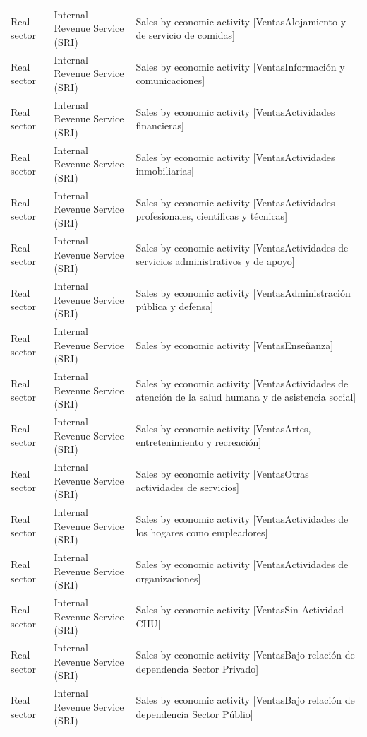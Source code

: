 \documentclass[10pt,a4paper]{article}
\begin{document}
\begin{longtable}{@{}>{\raggedright\arraybackslash}p{3.5cm}>{\raggedright\arraybackslash}p{5.6cm}>{\raggedright\arraybackslash}p{\dimexpr\textwidth-9.1cm-4\tabcolsep\relax}@{}}
Real sector & Internal Revenue Service (SRI) & Sales by economic activity [VentasAlojamiento y de servicio de comidas]\\
Real sector & Internal Revenue Service (SRI) & Sales by economic activity [VentasInformaci\'{o}n y comunicaciones]\\
Real sector & Internal Revenue Service (SRI) & Sales by economic activity [VentasActividades financieras]\\
Real sector & Internal Revenue Service (SRI) & Sales by economic activity [VentasActividades inmobiliarias]\\
Real sector & Internal Revenue Service (SRI) & Sales by economic activity [VentasActividades profesionales, cient\'{i}ficas y t\'{e}cnicas]\\
Real sector & Internal Revenue Service (SRI) & Sales by economic activity [VentasActividades de servicios administrativos y de apoyo]\\
Real sector & Internal Revenue Service (SRI) & Sales by economic activity [VentasAdministraci\'{o}n p\'{u}blica y defensa]\\
Real sector & Internal Revenue Service (SRI) & Sales by economic activity [VentasEnse\~{n}anza]\\
Real sector & Internal Revenue Service (SRI) & Sales by economic activity [VentasActividades de atenci\'{o}n de la salud humana y de asistencia social]\\
Real sector & Internal Revenue Service (SRI) & Sales by economic activity [VentasArtes, entretenimiento y recreaci\'{o}n]\\
Real sector & Internal Revenue Service (SRI) & Sales by economic activity [VentasOtras actividades de servicios]\\
Real sector & Internal Revenue Service (SRI) & Sales by economic activity [VentasActividades de los hogares como empleadores]\\
Real sector & Internal Revenue Service (SRI) & Sales by economic activity [VentasActividades de organizaciones]\\
Real sector & Internal Revenue Service (SRI) & Sales by economic activity [VentasSin Actividad CIIU]\\
Real sector & Internal Revenue Service (SRI) & Sales by economic activity [VentasBajo relaci\'{o}n de dependencia Sector Privado]\\
Real sector & Internal Revenue Service (SRI) & Sales by economic activity [VentasBajo relaci\'{o}n de dependencia Sector P\'{u}blio]\\

\end{longtable}
\end{document}
